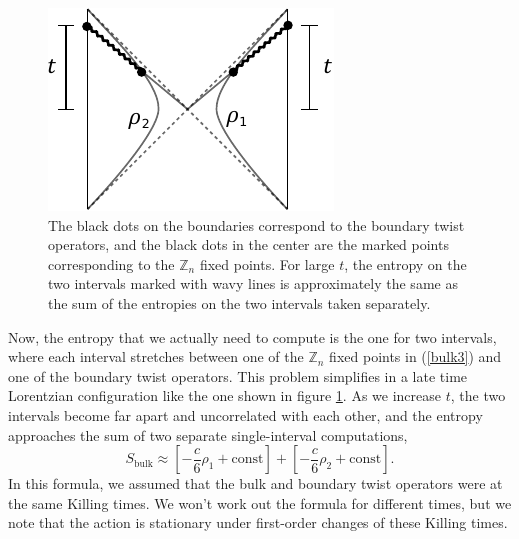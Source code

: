 \documentclass[11pt]{article}
\newcommand{\be}{\begin{equation}}
\newcommand{\ee}{\end{equation}}
\numberwithin{equation}{section}
\begin{document}
\begin{figure}[t]
\begin{center}
\includegraphics[scale = 1.2]{images/lorentz.pdf}
\caption{{\small The black dots on the boundaries correspond to the boundary twist operators, and the black dots in the center are the marked points corresponding to the $\mathbb{Z}_n$ fixed points. For large $t$, the entropy on the two intervals marked with wavy lines is approximately the same as the sum of the entropies on the two intervals taken separately.}}\label{fig:lorentz}
\end{center}
\end{figure}
Now, the entropy that we actually need to compute is the one for two intervals, where each interval stretches between one of the $\mathbb{Z}_n$ fixed points in (\ref{bulk3}) and one of the boundary twist operators. This problem simplifies in a late time Lorentzian configuration like the one shown in figure \ref{fig:lorentz}. As we increase $t$, the two intervals become far apart and uncorrelated with each other, and the entropy approaches the sum of two separate single-interval computations,
\be
S_{\text{bulk}} \approx \left[-\frac{c}{6}\rho_1 + \text{const}\right] + \left[-\frac{c}{6}\rho_2 + \text{const}\right].
\ee
In this formula, we assumed that the bulk and boundary twist operators were at the same Killing times. We won't work out the formula for different times, but we note that the action is stationary under first-order changes of these Killing times.
\end{document}
